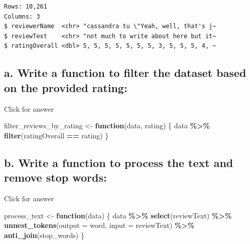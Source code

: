 \documentclass[
]{book}
\newenvironment{Shaded}{\begin{snugshade}}{\end{snugshade}}
\newcommand{\AttributeTok}[1]{\textcolor[rgb]{0.13,0.29,0.53}{#1}}
\newcommand{\ControlFlowTok}[1]{\textcolor[rgb]{0.13,0.29,0.53}{\textbf{#1}}}
\newcommand{\FunctionTok}[1]{\textcolor[rgb]{0.13,0.29,0.53}{\textbf{#1}}}
\newcommand{\NormalTok}[1]{#1}
\newcommand{\OtherTok}[1]{\textcolor[rgb]{0.56,0.35,0.01}{#1}}
\newcommand{\SpecialCharTok}[1]{\textcolor[rgb]{0.81,0.36,0.00}{\textbf{#1}}}
\begin{document}
\begin{verbatim}
Rows: 10,261
Columns: 3
$ reviewerName  <chr> "cassandra tu \"Yeah, well, that's j~
$ reviewText    <chr> "not much to write about here but it~
$ ratingOverall <dbl> 5, 5, 5, 5, 5, 5, 5, 3, 5, 5, 5, 4, ~
\end{verbatim}

\hypertarget{a.-write-a-function-to-filter-the-dataset-based-on-the-provided-rating}{%
\subsection{a. Write a function to filter the dataset based on the provided rating:}\label{a.-write-a-function-to-filter-the-dataset-based-on-the-provided-rating}}

Click for answer

\begin{Shaded}
\begin{Highlighting}[]
\NormalTok{filter\_reviews\_by\_rating }\OtherTok{\textless{}{-}} \ControlFlowTok{function}\NormalTok{(data, rating) \{}
\NormalTok{  data }\SpecialCharTok{\%\textgreater{}\%} \FunctionTok{filter}\NormalTok{(ratingOverall }\SpecialCharTok{==}\NormalTok{ rating)}
\NormalTok{\}}
\end{Highlighting}
\end{Shaded}

\hypertarget{b.-write-a-function-to-process-the-text-and-remove-stop-words}{%
\subsection{b. Write a function to process the text and remove stop words:}\label{b.-write-a-function-to-process-the-text-and-remove-stop-words}}

Click for answer

\begin{Shaded}
\begin{Highlighting}[]
\NormalTok{process\_text }\OtherTok{\textless{}{-}} \ControlFlowTok{function}\NormalTok{(data) \{}
\NormalTok{  data }\SpecialCharTok{\%\textgreater{}\%}
    \FunctionTok{select}\NormalTok{(reviewText) }\SpecialCharTok{\%\textgreater{}\%}
    \FunctionTok{unnest\_tokens}\NormalTok{(}\AttributeTok{output =}\NormalTok{ word, }\AttributeTok{input =}\NormalTok{ reviewText) }\SpecialCharTok{\%\textgreater{}\%}
    \FunctionTok{anti\_join}\NormalTok{(stop\_words)}
\NormalTok{\}}
\end{Highlighting}
\end{Shaded}
\end{document}
